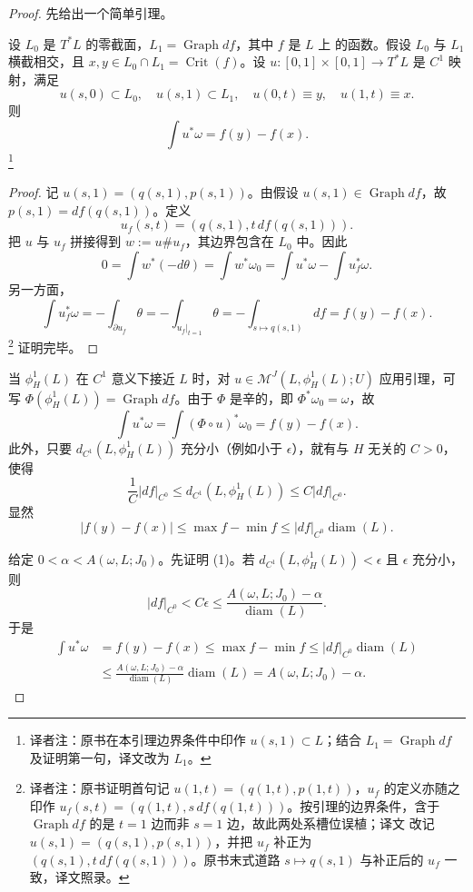 \begin{proof}
先给出一个简单引理。

\begin{lemma}
\label{lem:strip-area-graph-df}
设 $L_0$ 是 $T^*L$ 的零截面，$L_1=\operatorname{Graph}df$，其中 $f$ 是 $L$ 上
的函数。假设 $L_0$ 与 $L_1$ 横截相交，且
$x,y\in L_0\cap L_1=\operatorname{Crit}(f)$。设
$u:[0,1]\times[0,1]\to T^*L$ 是 $C^1$ 映射，满足
\[
 u(s,0)\subset L_0,\quad u(s,1)\subset L_1,\quad
 u(0,t)\equiv y,\quad u(1,t)\equiv x.
\]
则
\[
 \int u^*\omega=f(y)-f(x).
\]
\footnote{译者注：原书在本引理边界条件中印作 $u(s,1)\subset L$；结合
$L_1=\operatorname{Graph}df$ 及证明第一句，译文改为 $L_1$。}
\end{lemma}

\begin{proof}
记 $u(s,1)=(q(s,1),p(s,1))$。由假设 $u(s,1)\in\operatorname{Graph}df$，故
$p(s,1)=df(q(s,1))$。定义
\[
 u_f(s,t)=(q(s,1),t\,df(q(s,1))).
\]
把 $u$ 与 $u_f$ 拼接得到 $w:=u\#u_f$，其边界包含在 $L_0$ 中。因此
\[
 0=\int w^*(-d\theta)=\int w^*\omega_0
   =\int u^*\omega-\int u_f^*\omega.
\]
另一方面，
\[
 \int u_f^*\omega=-\int_{\partial u_f}\theta
 =-\int_{u_f|_{t=1}}\theta
 =-\int_{s\mapsto q(s,1)}df=f(y)-f(x).
\]
\footnote{译者注：原书证明首句记 $u(1,t)=(q(1,t),p(1,t))$，$u_f$ 的定义亦随之
印作 $u_f(s,t)=(q(1,t),s\,df(q(1,t)))$。按引理的边界条件，含于
$\operatorname{Graph}df$ 的是 $t=1$ 边而非 $s=1$ 边，故此两处系槽位误植；译文
改记 $u(s,1)=(q(s,1),p(s,1))$，并把 $u_f$ 补正为
$(q(s,1),t\,df(q(s,1)))$。原书末式道路 $s\mapsto q(s,1)$ 与补正后的 $u_f$
一致，译文照录。}
证明完毕。
\end{proof}

当 $\phi_H^1(L)$ 在 $C^1$ 意义下接近 $L$ 时，对
$u\in\mathcal M^J(L,\phi_H^1(L);U)$ 应用引理，可写
$\Phi(\phi_H^1(L))=\operatorname{Graph}df$。由于 $\Phi$ 是辛的，即
$\Phi^*\omega_0=\omega$，故
\[
 \int u^*\omega=\int(\Phi\circ u)^*\omega_0=f(y)-f(x).
\]
此外，只要 $d_{C^1}(L,\phi_H^1(L))$ 充分小（例如小于 $\epsilon$），就有与 $H$
无关的 $C>0$，使得
\[
 \frac1C|df|_{C^0}\leq d_{C^1}(L,\phi_H^1(L))\leq C|df|_{C^0}.
\]
显然
\[
 |f(y)-f(x)|\leq\max f-\min f\leq |df|_{C^0}\operatorname{diam}(L).
\]

给定 $0<\alpha<A(\omega,L;J_0)$。先证明 (1)。若
$d_{C^1}(L,\phi_H^1(L))<\epsilon$ 且 $\epsilon$ 充分小，则
\[
 |df|_{C^0}<C\epsilon\leq
 \frac{A(\omega,L;J_0)-\alpha}{\operatorname{diam}(L)}.
\]
于是
\[
 \begin{aligned}
 \int u^*\omega&=f(y)-f(x)\leq\max f-\min f
 \leq |df|_{C^0}\operatorname{diam}(L)\\
 &\leq\frac{A(\omega,L;J_0)-\alpha}{\operatorname{diam}(L)}
 \operatorname{diam}(L)=A(\omega,L;J_0)-\alpha.
 \end{aligned}
\]


\end{proof}
